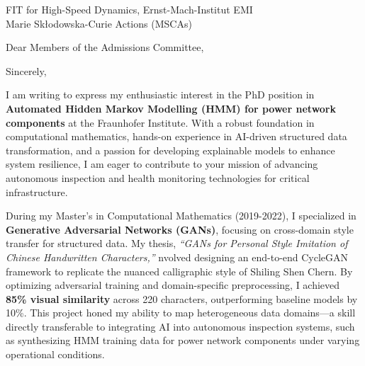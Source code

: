 \documentclass[11pt,a4paper, final]{moderncv}
\begin{document}
{FIT for High-Speed Dynamics, Ernst-Mach-Institut EMI\\
Marie Skłodowska-Curie Actions (MSCAs)\\
}
\date{\today}
\opening{Dear Members of the Admissions Committee,}
\closing{Sincerely,}
\makelettertitle
\thispagestyle{empty}
\pagestyle{empty}
I am writing to express my enthusiastic interest in the PhD position 
in \textbf{Automated Hidden Markov Modelling (HMM) for power network components} at the Fraunhofer Institute. 
With a robust foundation in computational mathematics, 
hands-on experience in AI-driven structured data transformation, 
and a passion for developing explainable models to enhance system resilience, 
I am eager to contribute to your mission of advancing autonomous inspection and health monitoring technologies for critical infrastructure.

During my Master's in Computational Mathematics (2019-2022), 
I specialized in \textbf{Generative Adversarial Networks (GANs)}, 
focusing on cross-domain style transfer for structured data. 
My thesis, \emph{``GANs for Personal Style Imitation of Chinese Handwritten Characters,''} 
nvolved designing an end-to-end CycleGAN framework to replicate the nuanced calligraphic style of Shiling Shen Chern. 
By optimizing adversarial training and domain-specific preprocessing, 
I achieved \textbf{85\% visual similarity} across 220 characters, outperforming baseline models by 10\%. 
This project honed my ability to map heterogeneous data domains—a skill directly transferable to integrating AI into autonomous inspection systems, 
such as synthesizing HMM training data for power network components under varying operational conditions.
\end{document}
